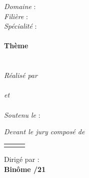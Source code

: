{\begin{titlepage}
		{\large \textit{Domaine} : \bfseries {\@domaine}}\\
		{\large \textit{Filière} : \bfseries {\@filiere}}\\
		{\large \textit{Spécialité} : \bfseries{\@specialite}}\\
		\vspace{0.5cm}
		\HRule \\[0.4cm]
		{\huge{\bfseries{Thème}}}\\
		\vspace{0.25cm}
		{\Huge \color[RGB]{18,96,149} \bfseries{\@title}\\[0.4cm] }
		\HRule \\[0.3cm]
		\vfill
		\vspace{0.3cm}
		\textit{Réalisé par}\\
		\vspace{0.125cm}
		{\Large {\bfseries \@author}} \\
		\vspace{0.125cm}
		\textit{et}\\
		\vspace{0.125cm}
		{\Large {\bfseries \@helper}} \\
		\vspace{0.5cm}
		\textit{Soutenu le} : {\bfseries \@date} \\
		\vfill
		\vspace{0.25cm}
		
		\large \textit{Devant le jury composé de\\}
		\vspace{0.25cm}
		\begin{tabular}{>{\bfseries}llr}
			
			\@jurya
			\@juryb
		\end{tabular}
		\vfill
		\vspace{0.5cm}
		Dirigé par : {\bfseries \@directeur}\\
		\vfill
		\vspace{0.25cm}
		\textbf{Binôme /21}
		
	\end{titlepage}
	\restoregeometry  
}
\makeatother
